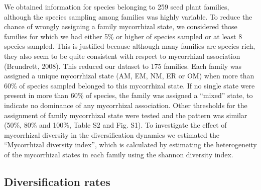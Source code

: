 \documentclass[12pt,]{article}
\begin{document}
We obtained information for species belonging to 259 seed plant
families, although the species sampling among families was highly
variable. To reduce the chance of wrongly assigning a family mycorrhizal
state, we considered those families for which we had either 5\% or
higher of species sampled or at least 8 species sampled. This is
justified because although many families are species-rich, they also
seem to be quite consistent with respect to mycorrhizal association
(Brundrett, 2008). This reduced our dataset to 175 families. Each family
was assigned a unique mycorrhizal state (AM, EM, NM, ER or OM) when more
than 60\% of species sampled belonged to this mycorrhizal state. If no
single state were present in more than 60\% of species, the family was
assigned a ``mixed'' state, to indicate no dominance of any mycorrhizal
association. Other thresholds for the assignment of family mycorrhizal
state were tested and the pattern was similar (50\%, 80\% and 100\%,
Table S2 and Fig. S1). To investigate the effect of mycorrhizal
diversity in the diversification dynamics we estimated the ``Mycorrhizal
diversity index'', which is calculated by estimating the heterogeneity
of the mycorrhizal states in each family using the shannon diversity
index.

\hypertarget{diversification-rates}{%
\subsection{Diversification rates}\label{diversification-rates}}
\end{document}
